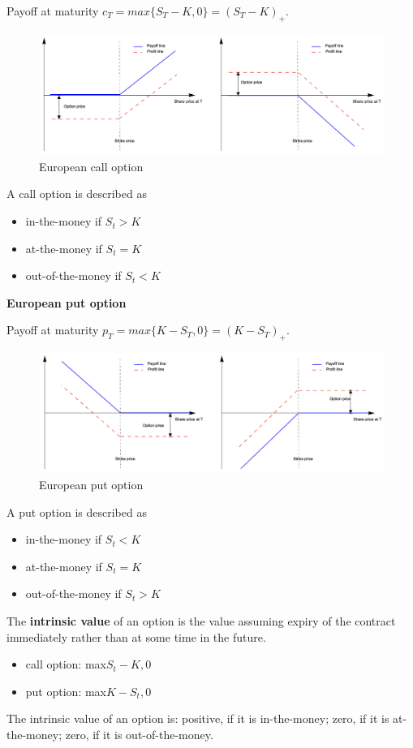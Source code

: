 \documentclass[11pt,a4paper]{book}
\theoremstyle{definition}\newtheorem{definition}{Definition}
\theoremstyle{definition}\newtheorem{fact}{Fact}
\theoremstyle{definition}\newtheorem{remark}{Remark}
\theoremstyle{definition}\newtheorem{ex}{Ex.}
\theoremstyle{definition}\newtheorem{project}{Project}
\theoremstyle{definition}\newtheorem{problem}{Problem}
\theoremstyle{definition}\newtheorem{example}{Example}
\numberwithin{theorem}{section}
\numberwithin{corollary}{chapter}
\numberwithin{assumption}{chapter}
\numberwithin{definition}{chapter}
\numberwithin{prop}{chapter}
\numberwithin{notation}{chapter}
\numberwithin{problem}{chapter}
\numberwithin{example}{chapter}
\numberwithin{fact}{chapter}
\numberwithin{ex}{chapter}
\begin{document}
Payoff at maturity $c_T = max\{S_T - K, 0\} = (S_T - K)_+$.

\begin{figure}[H]
	\centering
	\includegraphics[scale=0.4]{Chapter 3/Chapter3_1.png}
	\caption{European call option}
\end{figure}

A call option is described as
\begin{itemize}
\item in-the-money if $S_t > K$
\item at-the-money if $S_t = K$
\item out-of-the-money if $S_t < K$
\end{itemize}

\textbf{European put option}

Payoff at maturity $p_T = max\{K - S_T, 0\} = (K - S_T)_+$.

\begin{figure}[H]
	\centering
	\includegraphics[scale=0.4]{Chapter 3/Chapter3_2.png}
	\caption{European put option}
\end{figure}

A put option is described as
\begin{itemize}
\item in-the-money if $S_t < K$
\item at-the-money if $S_t = K$
\item out-of-the-money if $S_t > K$
\end{itemize}

The \textbf{intrinsic value} of an option is the value assuming expiry of the contract immediately rather than at some time in the future.
\begin{itemize}
\item call option: max{$S_t - K, 0$}
\item put option: max{$K - S_t, 0$}
\end{itemize}
The intrinsic value of an option is: positive, if it is in-the-money; zero, if it is at-the-money; zero, if it is out-of-the-money.
\end{document}
